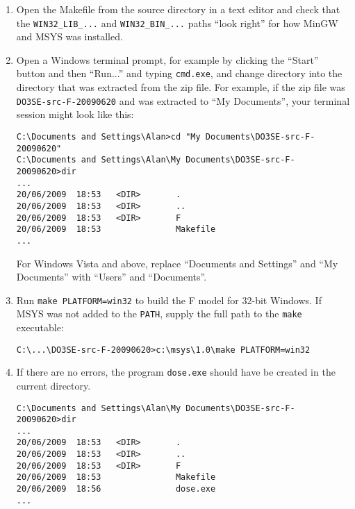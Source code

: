 \documentclass[10pt,a4paper]{article}
\begin{document}
\begin{enumerate}

\item Open the Makefile from the source directory in a text editor and check that the 
\verb|WIN32_LIB_...| and \verb|WIN32_BIN_...| paths ``look right'' for how MinGW and MSYS was 
installed.

\item Open a Windows terminal prompt, for example by clicking the ``Start'' button and then 
``Run...'' and typing \verb|cmd.exe|, and change directory into the directory that was extracted 
from the zip file.  For example, if the zip file was \verb|DO3SE-src-F-20090620| and was extracted 
to ``My Documents'', your terminal session might look like this:
\begin{lstlisting}
C:\Documents and Settings\Alan>cd "My Documents\DO3SE-src-F-20090620"
C:\Documents and Settings\Alan\My Documents\DO3SE-src-F-20090620>dir
...
20/06/2009  18:53   <DIR>       .
20/06/2009  18:53   <DIR>       ..
20/06/2009  18:53   <DIR>       F
20/06/2009  18:53               Makefile
...
\end{lstlisting}
For Windows Vista and above, replace ``Documents and Settings'' and ``My Documents'' with ``Users'' 
and ``Documents''.

\item Run \verb|make PLATFORM=win32| to build the F model for 32-bit Windows.  If MSYS was not added 
to the \verb|PATH|, supply the full path to the \verb|make| executable:
\begin{lstlisting}
C:\...\DO3SE-src-F-20090620>c:\msys\1.0\make PLATFORM=win32
\end{lstlisting}

\item If there are no errors, the program \verb|dose.exe| should have be created in the current 
directory.
\begin{lstlisting}
C:\Documents and Settings\Alan\My Documents\DO3SE-src-F-20090620>dir
...
20/06/2009  18:53   <DIR>       .
20/06/2009  18:53   <DIR>       ..
20/06/2009  18:53   <DIR>       F
20/06/2009  18:53               Makefile
20/06/2009  18:56               dose.exe
...
\end{lstlisting}

\end{enumerate}


\end{document}
